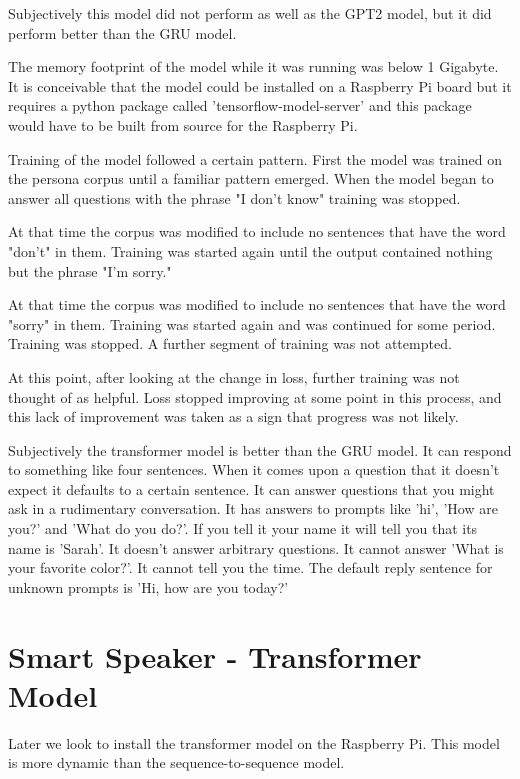 Subjectively this model did not perform as well as the GPT2 model, but it did perform better than the GRU model.

The memory footprint of the model while it was running was below 1 Gigabyte. It is conceivable that the model could be installed on a Raspberry Pi board but it requires a python package called 'tensorflow-model-server' and this package would have to be built from source for the Raspberry Pi. 

Training of the model followed a certain pattern. First the model was trained on the persona corpus until a familiar pattern emerged. When the model began to answer all questions with the 
phrase "I don't know" training was stopped. 

At that time the corpus was modified to include no 
sentences that have the word "don't" in them. Training was started again until the output contained nothing but the phrase "I'm sorry." 

At that time the corpus was modified to include no sentences that have the word "sorry" in them.
Training was started again and was continued for some period. Training was stopped. A further segment of training was not attempted. 

At this point, after looking at the change in loss, further training was not
thought of as helpful. Loss stopped improving at some point in this process, and this lack of
improvement was taken as a sign that progress was not likely.

Subjectively the transformer model is better than the GRU model. It can respond to something like
four sentences. When it comes upon a question that it doesn't expect it defaults to a certain sentence. It can answer questions that you might ask in a rudimentary conversation. It has answers to prompts like 'hi', 'How are you?' and 'What do you do?'. If you tell it your name it will tell you that its name is 'Sarah'. It doesn't answer arbitrary questions. It cannot answer 'What is your favorite color?'. It cannot tell you the time. The default reply sentence for unknown prompts is 'Hi, how are you today?'

\section{Smart Speaker - Transformer Model}

Later we look to install the transformer model on the Raspberry Pi. This model is more dynamic than the sequence-to-sequence model. 

